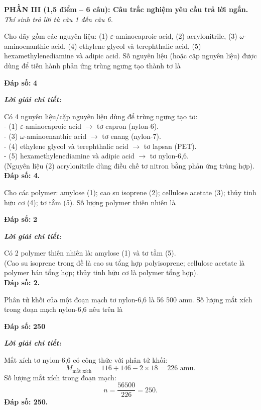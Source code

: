\documentclass[11pt,a4paper]{article}
\def\loigiai#1{
\par\begingroup\color{blue!80!black}\small
\noindent\textbf{\textit{Lời giải chi tiết:}}\par
#1\par\endgroup}
\begin{document}
\noindent
\textbf{PHẦN III (1,5 điểm -- 6 câu): Câu trắc nghiệm yêu cầu trả lời ngắn.}\\
\textit{Thí sinh trả lời từ câu 1 đến câu 6.}

\setcounter{ex}{0}

\begin{ex}
Cho dãy gồm các nguyên liệu: (1) $\varepsilon$-aminocaproic acid, (2) acrylonitrile, (3) $\omega$-aminoenanthic acid, (4) ethylene glycol và terephthalic acid, (5) hexamethylenediamine và adipic acid. Số nguyên liệu (hoặc cặp nguyên liệu) được dùng để tiến hành phản ứng trùng ngưng tạo thành tơ là
\par\noindent\textbf{Đáp số:} \textbf{\color{red}4}
\loigiai{
Có 4 nguyên liệu/cặp nguyên liệu dùng để trùng ngưng tạo tơ:\\
- (1) $\varepsilon$-aminocaproic acid $\rightarrow$ tơ capron (nylon-6).\\
- (3) $\omega$-aminoenanthic acid $\rightarrow$ tơ enang (nylon-7).\\
- (4) ethylene glycol và terephthalic acid $\rightarrow$ tơ lapsan (PET).\\
- (5) hexamethylenediamine và adipic acid $\rightarrow$ tơ nylon-6,6.\\
(Nguyên liệu (2) acrylonitrile dùng điều chế tơ nitron bằng phản ứng trùng hợp).\\
\textbf{Đáp số: 4.}}
\end{ex}

\begin{ex}
Cho các polymer: amylose (1); cao su isoprene (2); cellulose acetate (3); thủy tinh hữu cơ (4); tơ tằm (5). Số lượng polymer thiên nhiên là
\par\noindent\textbf{Đáp số:} \textbf{\color{red}2}
\loigiai{
Có 2 polymer thiên nhiên là: amylose (1) và tơ tằm (5).\\
(Cao su isoprene trong đề là cao su tổng hợp polyisoprene; cellulose acetate là polymer bán tổng hợp; thủy tinh hữu cơ là polymer tổng hợp).\\
\textbf{Đáp số: 2.}}
\end{ex}

\begin{ex}
Phân tử khối của một đoạn mạch tơ nylon-6,6 là 56 500 amu. Số lượng mắt xích trong đoạn mạch nylon-6,6 nêu trên là
\par\noindent\textbf{Đáp số:} \textbf{\color{red}250}
\loigiai{
Mắt xích tơ nylon-6,6 có công thức \ce{[-NH-(CH2)6-NH-CO-(CH2)4-CO-]} với phân tử khối:
$$M_{\text{mắt xích}} = 116 + 146 - 2 \times 18 = 226\text{ amu.}$$
Số lượng mắt xích trong đoạn mạch:
$$n = \frac{56500}{226} = 250.$$
\textbf{Đáp số: 250.}}
\end{ex}
\end{document}

